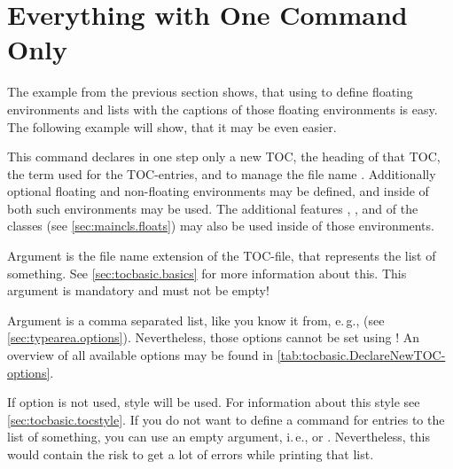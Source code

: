 \section{Everything with One Command Only}
\label{sec:tocbasic.highlevel}

The example from the previous section shows, that using  to
define floating environments and lists with the captions of those floating
environments is easy. The following example will show, that it may be even
easier.

\begin{Declaration}
\end{Declaration}
This command declares in one step only a
new TOC, the heading of that TOC, the term used for the TOC-entries, and to
manage the file name . Additionally optional floating and
non-floating environments may be defined, and inside of both such environments
%
 may be used. The
additional features , , and
 of the \KOMAScript{} classes (see
\autoref{sec:maincls.floats}) may also be used inside of those environments.

Argument  is the file name extension of the TOC-file, that
represents the list of something. See \autoref{sec:tocbasic.basics} for more
information about this. This argument is mandatory and must not be empty!

Argument  is a comma separated list, like you know it from,
e.\,g.,  (see
\autoref{sec:typearea.options}). Nevertheless, those
options cannot be set using
! An overview of all
available options may be found in
\autoref{tab:tocbasic.DeclareNewTOC-options}.

If option 
is not used, style  will be used. For information about this
style see \autoref{sec:tocbasic.tocstyle}. If you do not want to define a
command for entries to the list of something, you can use an empty argument,
i.\,e.,  or
. Nevertheless, this would contain
the risk to get a lot of errors while printing that list.

